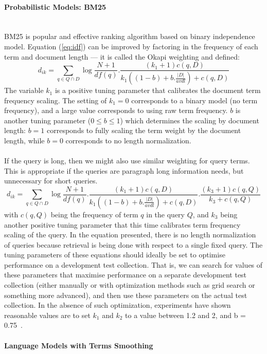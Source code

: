 \paragraph{Probabilistic Models: BM25}
\ \\
BM25 is popular and effective ranking algorithm based on binary independence model. Equation (\ref{eq:idf}) can be improved by factoring in the frequency of each term and document length --- it is called the Okapi weighting and defined:
\begin{equation}
d_{ik}=\sum\limits_{q \in Q\cap D}\log\frac{N+1}{df(q)}.\frac{(k_{1}+1)c(q,D)}{k_{1}((1-b)+b.\frac{|D|}{avdl})+c(q,D)}
\label{eq:idfbm25}
\end{equation}
The variable $ k_{1} $ is a positive tuning parameter that calibrates the document term frequency scaling. The setting of $ k_{1}=0 $  corresponds to a binary model (no term frequency), and a large value corresponds to using raw term
frequency. $ b $ is another tuning parameter ($ 0 \leq b \leq 1 $) which determines the scaling by document length: $ b = 1 $ corresponds to fully scaling the term weight by the document length, while $ b = 0 $ corresponds to no length normalization. \\\\
If the query is long, then we might also use similar weighting for query terms. This is appropriate if the queries are paragraph long information needs, but unnecessary for short queries.
\begin{equation}
d_{ik}=\sum\limits_{q \in Q\cap D}\log\frac{N+1}{df(q)}.\frac{(k_{1}+1)c(q,D)}{k_{1}((1-b)+b.\frac{|D|}{avdl})+c(q,D)}.\frac{(k_{3}+1)c(q,Q)}{k_{3}+c(q,Q)}
\label{eq:idfbm25}
\end{equation}
with $ c(q,Q) $ being the frequency of term $ q $ in the query $ Q $, and $ k_{3} $ being another positive tuning parameter that this time calibrates term frequency scaling of the query. In the equation presented, there is no length normalization of
queries because retrieval is being done with respect to a single fixed query. The tuning parameters of these equations should ideally be set to optimise performance on a development test collection. That is, we can search for values of these parameters that maximise performance on a separate development test collection (either manually or with optimization methods such as grid search or something more advanced), and then use these parameters on the actual test collection. In the absence of such optimization, experiments have shown reasonable values are to set $ k_{1} $ and $ k_{2} $ to a value between 1.2 and 2, and b = 0.75~\citep{manning2008introduction}.

\paragraph{Language Models with Terms Smoothing}
\ \\
